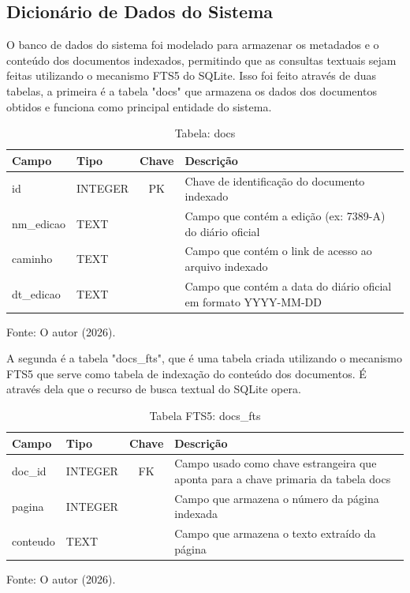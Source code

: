 \subsection{Dicionário de Dados do Sistema }

O banco de dados do sistema foi modelado para armazenar os metadados e o conteúdo dos documentos indexados, permitindo que as consultas textuais sejam feitas utilizando o mecanismo FTS5 do SQLite. Isso foi feito através de duas tabelas, a primeira é a tabela "docs" que armazena os dados dos documentos obtidos e funciona como principal entidade do sistema.

\begin{table}[h]
    \centering
    \caption{Tabela: docs}
    \label{tab:tabela_tbl_docs}
    \begin{tabularx}{\textwidth}{l l c X}
        \toprule
        Campo & Tipo & Chave & Descrição \\
        \midrule
        id & INTEGER & PK & Chave de identificação do documento indexado \\
        nm\_edicao & TEXT & & Campo que contém a edição (ex: 7389-A) do diário oficial  \\
        caminho & TEXT & & Campo que contém o link de acesso ao arquivo indexado\\
        dt\_edicao & TEXT & & Campo que contém a data do diário oficial em formato YYYY-MM-DD\\
        \bottomrule
    \end{tabularx}
\end{table}{\footnotesize Fonte: O autor (2026).}

A segunda é a tabela "docs\_fts", que é uma tabela criada utilizando o mecanismo FTS5 que serve como tabela de indexação do conteúdo dos documentos. É através dela que o recurso de busca textual do SQLite opera.

\begin{table}[h]
    \centering
    \caption{Tabela FTS5: docs\_fts}
    \label{tab:tabela_tbl_fts5_docs}
    \begin{tabularx}{\textwidth}{l l c X}
        \toprule
        Campo & Tipo & Chave & Descrição \\
        \midrule
        doc\_id & INTEGER & FK & Campo usado como chave estrangeira que aponta para a chave primaria da tabela docs \\
         pagina & INTEGER &  &  Campo que armazena o número da página indexada\\
         conteudo & TEXT &  & Campo que armazena o texto extraído da página \\
        \bottomrule
    \end{tabularx}
\end{table}{\footnotesize Fonte: O autor (2026).}

